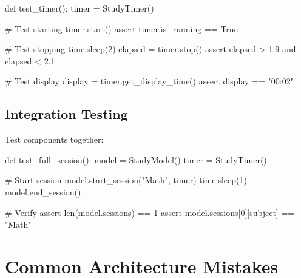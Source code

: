 \documentclass[
  letterpaper,
  DIV=11,
  numbers=noendperiod,
  oneside]{scrreprt}
\newenvironment{Shaded}{}{}
\newcommand{\BuiltInTok}[1]{\textcolor[rgb]{0.84,0.23,0.29}{#1}}
\newcommand{\CommentTok}[1]{\textcolor[rgb]{0.42,0.45,0.49}{#1}}
\newcommand{\ControlFlowTok}[1]{\textcolor[rgb]{0.84,0.23,0.29}{#1}}
\newcommand{\DecValTok}[1]{\textcolor[rgb]{0.00,0.36,0.77}{#1}}
\newcommand{\FloatTok}[1]{\textcolor[rgb]{0.00,0.36,0.77}{#1}}
\newcommand{\KeywordTok}[1]{\textcolor[rgb]{0.84,0.23,0.29}{#1}}
\newcommand{\NormalTok}[1]{\textcolor[rgb]{0.14,0.16,0.18}{#1}}
\newcommand{\OperatorTok}[1]{\textcolor[rgb]{0.14,0.16,0.18}{#1}}
\newcommand{\StringTok}[1]{\textcolor[rgb]{0.01,0.18,0.38}{#1}}
\newcommand{\VariableTok}[1]{\textcolor[rgb]{0.89,0.38,0.04}{#1}}
\begin{document}
\begin{Shaded}
\begin{Highlighting}[]
\KeywordTok{def}\NormalTok{ test\_timer():}
\NormalTok{    timer }\OperatorTok{=}\NormalTok{ StudyTimer()}
    
    \CommentTok{\# Test starting}
\NormalTok{    timer.start()}
    \ControlFlowTok{assert}\NormalTok{ timer.is\_running }\OperatorTok{==} \VariableTok{True}
    
    \CommentTok{\# Test stopping}
\NormalTok{    time.sleep(}\DecValTok{2}\NormalTok{)}
\NormalTok{    elapsed }\OperatorTok{=}\NormalTok{ timer.stop()}
    \ControlFlowTok{assert}\NormalTok{ elapsed }\OperatorTok{\textgreater{}} \FloatTok{1.9} \KeywordTok{and}\NormalTok{ elapsed }\OperatorTok{\textless{}} \FloatTok{2.1}
    
    \CommentTok{\# Test display}
\NormalTok{    display }\OperatorTok{=}\NormalTok{ timer.get\_display\_time()}
    \ControlFlowTok{assert}\NormalTok{ display }\OperatorTok{==} \StringTok{"00:02"}
\end{Highlighting}
\end{Shaded}

\subsection{Integration Testing}\label{integration-testing}

Test components together:

\begin{Shaded}
\begin{Highlighting}[]
\KeywordTok{def}\NormalTok{ test\_full\_session():}
\NormalTok{    model }\OperatorTok{=}\NormalTok{ StudyModel()}
\NormalTok{    timer }\OperatorTok{=}\NormalTok{ StudyTimer()}
    
    \CommentTok{\# Start session}
\NormalTok{    model.start\_session(}\StringTok{"Math"}\NormalTok{, timer)}
\NormalTok{    time.sleep(}\DecValTok{1}\NormalTok{)}
\NormalTok{    model.end\_session()}
    
    \CommentTok{\# Verify}
    \ControlFlowTok{assert} \BuiltInTok{len}\NormalTok{(model.sessions) }\OperatorTok{==} \DecValTok{1}
    \ControlFlowTok{assert}\NormalTok{ model.sessions[}\DecValTok{0}\NormalTok{][}\StringTok{\textquotesingle{}subject\textquotesingle{}}\NormalTok{] }\OperatorTok{==} \StringTok{"Math"}
\end{Highlighting}
\end{Shaded}

\section{Common Architecture
Mistakes}\label{common-architecture-mistakes}
\end{document}

